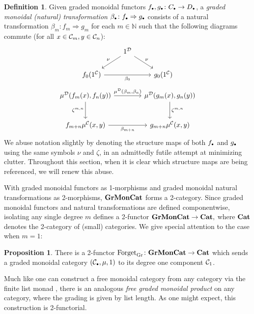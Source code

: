 \documentclass[openany, amssymb, psamsfonts]{amsart}
\theoremstyle{definition}
\newtheorem{prop}{Proposition}[section]
\newtheorem{defn}{Definition}[section]
\numberwithin{equation}{section}
\begin{document}
\begin{defn}
Given graded monoidal functors $f_\sbull, g_\sbull \colon C_\sbull \to D_\sbull$, a \emph{graded monoidal (natural) transformation} $\beta_\sbull \colon f_\sbull \Rightarrow g_\sbull$ consists of a natural transformation $\beta_m \colon f_m \Rightarrow g_m$ for each $m \in \mathbb{N}$ such that the following diagrams commute (for all $x \in \mathcal{C}_m, y \in \mathcal{C}_n$):
\begin{equation*}
\begin{tikzcd}
    & 1^\D \ar[dl, "\nu"'] \ar[dr, "\nu"] \\
    f_0(1^\C) \ar[rr, "\beta_0"'] && g_0(1^\C)
\end{tikzcd}
\end{equation*}
\begin{equation*}
\begin{tikzcd}[column sep = 4em, row sep = 2.5em]
    \mu^\D(f_m(x), f_n(y)) \ar[r, "\mu^\D(\beta_m{,} \beta_n)"] \ar[d, "\zeta^{m, n}"'] & \mu^\D(g_m(x), g_n(y)) \ar[d, "\zeta^{m, n}"] \\
    f_{m+n}\mu^\C(x, y) \ar[r, "\beta_{m+n}"'] & g_{m+n}\mu^\C(x, y)
\end{tikzcd}
\end{equation*}
We abuse notation slightly by denoting the structure maps of both $f_\sbull$ and $g_\sbull$ using the same symbols $\nu$ and $\zeta$, in an admittedly futile attempt at minimizing clutter. Throughout this section, when it is clear which structure maps are being referenced, we will renew this abuse.
\end{defn}

With graded monoidal functors as 1-morphisms and graded monoidal natural transformations as 2-morphisms, $\textbf{\textup{GrMonCat}}$ forms a 2-category. Since graded monoidal functors and natural transformations are defined componentwise, isolating any single degree $m$ defines a 2-functor $\textbf{\textup{GrMonCat}} \to \textbf{\textup{Cat}},$ where $\textbf{\textup{Cat}}$ denotes the 2-category of (small) categories. We give special attention to the case when $m = 1$:

\begin{prop} \label{prop:forget-gr}
There is a 2-functor $\mathrm{Forget}_{\mathrm{Gr}} \colon \textbf{\textup{GrMonCat}} \to \textbf{\textup{Cat}}$ which sends a graded monoidal category $(\C_\sbull, \mu, 1)$ to its degree one component $\mathcal{C}_1$.
\end{prop}

Much like one can construct a free monoidal category from any category via the finite list monad \cite[Section VII.3, Theorem 2]{maclane}, there is an analogous \emph{free graded monoidal product} on any category, where the grading is given by list length. As one might expect, this construction is 2-functorial.
\end{document}
